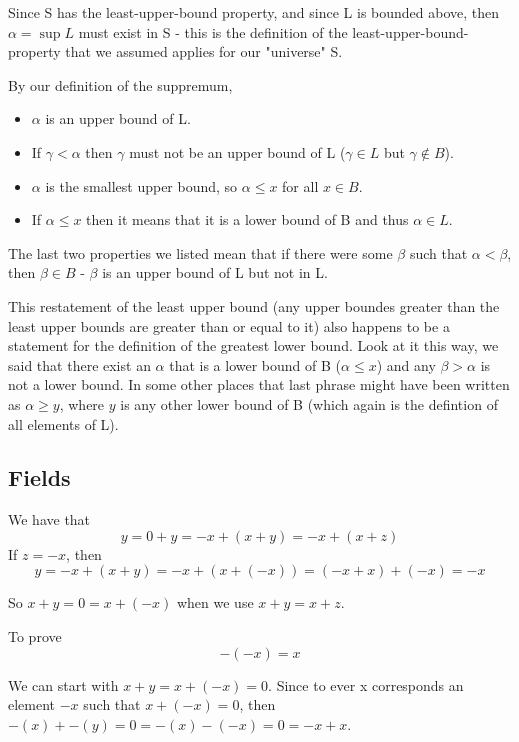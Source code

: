 Since S has the least-upper-bound property, and since L is bounded above, then $\alpha = \sup L$ must exist
in S - this is the definition of the least-upper-bound-property that we assumed applies for our "universe"
S.

By our definition of the suppremum,
\begin{itemize}
    \item $\alpha$ is an upper bound of L.
    \item If $\gamma < \alpha$ then $\gamma$ must not be an upper bound of L ($\gamma \in L$ but $\gamma \notin B$).
    \item $\alpha$ is the smallest upper bound, so $\alpha \leq x$ for all $x\in B$.
    \item If $\alpha \leq x$ then it means that it is a lower bound of B and thus $\alpha \in L$.
\end{itemize}

The last two properties we listed mean that if there were some $\beta$ such that $\alpha < \beta$,
then $\beta \in B$ - $\beta$ is an upper bound of L but not in L.

This restatement of the least upper bound (any upper boundes greater than the least upper bounds are greater than or equal to it)
also happens to be a statement for the definition of the greatest lower bound.
Look at it this way, we said that there exist an $\alpha$ that is a lower bound of B ($\alpha \leq x$)
and any $\beta > \alpha$ is not a lower bound.
In some other places that last phrase might have been written as $\alpha \geq y$, where $y$ is
any other lower bound of B (which again is the defintion of all elements of L).



\subsection{Fields}

We have that
$$
y = 0 + y = -x + (x + y)
= -x + (x + z)
$$
If $z = -x$, then
$$
y = -x + (x + y)
= -x + (x + (-x)) = (-x + x) + (-x)
= -x
$$

So $x + y = 0 = x + (-x)$ when we use $x+y = x+z$.

To prove
$$
- (-x) = x
$$

We can start with $x+y = x + (-x) = 0$.
Since to ever x corresponds an element $-x$ such that $x+(-x)=0$, then
$-(x) + -(y) = 0 = -(x) -(-x) = 0 = -x + x$.
\\

